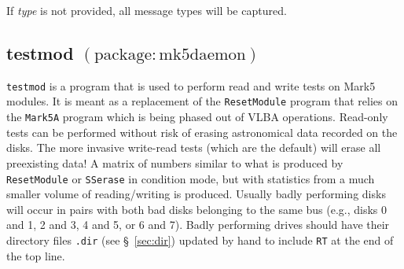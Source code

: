 If {\em type} is not provided, all message types will be captured.




\subsection{testmod {\small $\mathrm{(package: mk5daemon)}$}} \label{sec:testmod}

{\tt testmod} is a program that is used to perform read and write tests on Mark5 modules.  
It is meant as a replacement of the {\tt ResetModule} program that relies on the {\tt Mark5A} program which is being phased out of VLBA operations.
Read-only tests can be performed without risk of erasing astronomical data recorded on the disks.
The more invasive write-read tests (which are the default) will erase all preexisting data!
A matrix of numbers similar to what is produced by {\tt ResetModule} or {\tt SSerase} in condition mode, but with statistics from a much smaller volume of reading/writing is produced.
Usually badly performing disks will occur in pairs with both bad disks belonging to the same bus (e.g., disks 0 and 1, 2 and 3, 4 and 5, or 6 and 7).  
Badly performing drives should have their directory files {\tt .dir} (see \S~\ref{sec:dir}) updated by hand to include {\tt RT} at the end of the top line.

